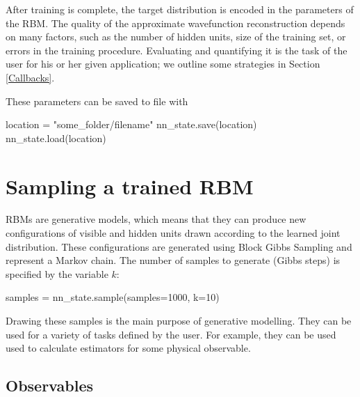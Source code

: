 \documentclass[submission, Phys]{SciPost}
\begin{document}
After training is complete, the target distribution is encoded in the parameters of the RBM.
The quality of the approximate wavefunction reconstruction depends on many factors, such as the number of hidden units, size of the training set, or errors in the training procedure.
Evaluating and quantifying it is the task of the user for his or her given application; we outline some strategies in Section \ref{Callbacks}.

These parameters can be saved to file with

\begin{python}
	location = "some_folder/filename"
	nn_state.save(location)
	nn_state.load(location)
\end{python}


\section{Sampling a trained RBM}
\label{Sec:Sampling_a-Trained_RBM}

RBMs are generative models, which means that they can produce new configurations of visible and hidden units
drawn according to the learned joint distribution.
These configurations are generated using Block Gibbs Sampling and represent a Markov chain.
The number of samples to generate (Gibbs steps) is specified by the variable $k$:
\begin{python}
	samples = nn_state.sample(samples=1000, k=10)
\end{python}

Drawing these samples is the main purpose of generative modelling. 
They can be used for a variety of tasks defined by the user.
For example, they can be used used to calculate estimators for some physical observable.

\subsection{Observables}
\label{Sec:Observables}
\end{document}
